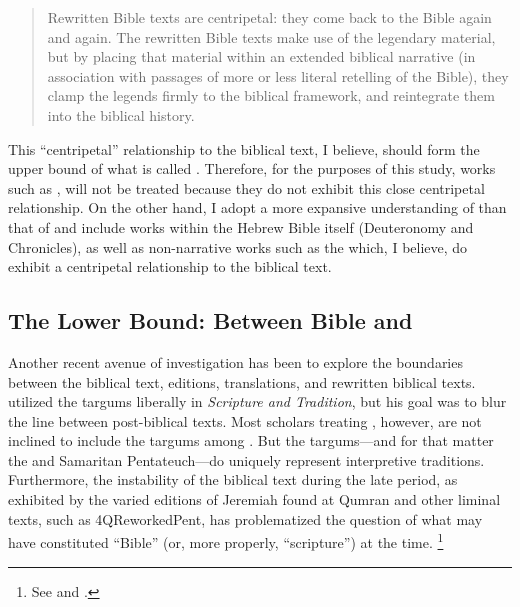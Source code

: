 \begin{quote}
    Rewritten Bible texts are centripetal: they come back to the Bible again and again. The rewritten Bible texts make use of the legendary material, but by placing that material within an extended biblical narrative (in association with passages of more or less literal retelling of the Bible), they clamp the legends firmly to the biblical framework, and reintegrate them into the biblical history.%
    \autocite[117]{alexander_carson-williamson1988}
\end{quote} 
\noindent
This ``centripetal'' relationship to the biblical text, I believe, should form the upper bound of what is called \rwb. Therefore, for the purposes of this study, works such as \firstenoch, will not be treated because they do not exhibit this close centripetal relationship. On the other hand, I adopt a more expansive understanding of \rwb than that of \vermes and include works within the Hebrew Bible itself (Deuteronomy and Chronicles), as well as non-narrative works such as the \templescroll which, I believe, do exhibit a centripetal relationship to the biblical text. 


\subsection{The Lower Bound: Between Bible and \rwb}

Another recent avenue of investigation has been to explore the boundaries between the biblical text, editions, translations, and rewritten biblical texts. \vermes utilized the targums liberally in \emph{Scripture and Tradition}, but his goal was to blur the line between post-biblical texts. Most scholars treating \rwb, however, are not inclined to include the targums among \rwb. But the targums---and for that matter the \lxx and Samaritan Pentateuch---do uniquely represent interpretive traditions. Furthermore, the instability of the biblical text during the late \secondtemple period, as exhibited by the varied editions of Jeremiah found at Qumran and other liminal texts, such as 4QReworkedPent, has problematized the question of what may have constituted ``Bible'' (or, more properly, ``scripture'') at the time.%
    \footnote{%
        See \cite{zahn2011} and \cite{zahn_dsd2008}.}

